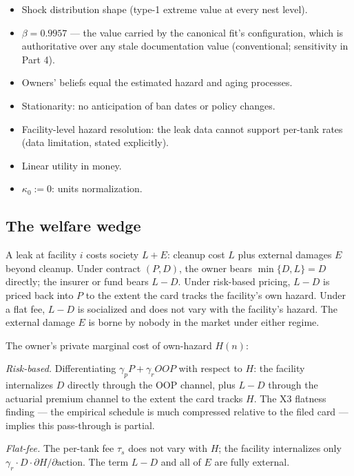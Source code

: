 \documentclass[
  letterpaper,
  DIV=11,
  numbers=noendperiod]{scrartcl}
\providecommand{\tightlist}{%
  \setlength{\itemsep}{0pt}\setlength{\parskip}{0pt}}\usepackage{longtable,booktabs,array}
\begin{document}
\begin{itemize}
\tightlist
\item
  Shock distribution shape (type-1 extreme value at every nest level).
\item
  \(\beta = 0.9957\) --- the value carried by the canonical fit's
  configuration, which is authoritative over any stale documentation
  value (conventional; sensitivity in Part 4).
\item
  Owners' beliefs equal the estimated hazard and aging processes.
\item
  Stationarity: no anticipation of ban dates or policy changes.
\item
  Facility-level hazard resolution: the leak data cannot support
  per-tank rates (data limitation, stated explicitly).
\item
  Linear utility in money.
\item
  \(\kappa_0 := 0\): units normalization.
\end{itemize}

\subsection{The welfare wedge}\label{the-welfare-wedge}

A leak at facility \(i\) costs society \(L + E\): cleanup cost \(L\)
plus external damages \(E\) beyond cleanup. Under contract \((P, D)\),
the owner bears \(\min\{D, L\} = D\) directly; the insurer or fund bears
\(L - D\). Under risk-based pricing, \(L - D\) is priced back into \(P\)
to the extent the card tracks the facility's own hazard. Under a flat
fee, \(L - D\) is socialized and does not vary with the facility's
hazard. The external damage \(E\) is borne by nobody in the market under
either regime.

The owner's private marginal cost of own-hazard \(H(n)\):

\emph{Risk-based.} Differentiating \(\gamma_p P + \gamma_r OOP\) with
respect to \(H\): the facility internalizes \(D\) directly through the
OOP channel, plus \(L - D\) through the actuarial premium channel to the
extent the card tracks \(H\). The X3 flatness finding --- the empirical
schedule is much compressed relative to the filed card --- implies this
pass-through is partial.

\emph{Flat-fee.} The per-tank fee \(\tau_s\) does not vary with \(H\);
the facility internalizes only
\(\gamma_r \cdot D \cdot \partial H/\partial \text{action}\). The term
\(L - D\) and all of \(E\) are fully external.
\end{document}
